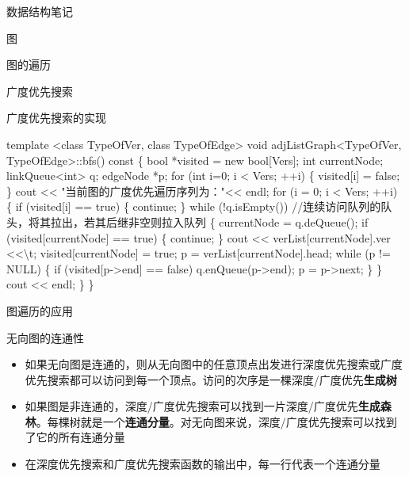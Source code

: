 \documentclass[
  ignorenonframetext,
]{beamer}
\newenvironment{Shaded}{}{}
\newcommand{\NormalTok}[1]{#1}
\providecommand{\tightlist}{%
  \setlength{\itemsep}{0pt}\setlength{\parskip}{0pt}}
\begin{document}
\begin{frame}[fragile]{数据结构笔记}
\begin{block}{图}
\begin{block}{图的遍历}
\begin{block}{广度优先搜索}
\begin{block}{广度优先搜索的实现}
\begin{Shaded}
\begin{Highlighting}[]
\NormalTok{template \textless{}class TypeOfVer, class TypeOfEdge\textgreater{}}
\NormalTok{void adjListGraph\textless{}TypeOfVer, TypeOfEdge\textgreater{}::bfs() const}
\NormalTok{\{}
\NormalTok{  bool *visited = new bool[Vers];}
\NormalTok{  int currentNode;}
\NormalTok{  linkQueue\textless{}int\textgreater{} q;}
\NormalTok{  edgeNode *p; }
\NormalTok{  for (int i=0; i \textless{} Vers; ++i)}
\NormalTok{  \{}
\NormalTok{   visited[i] = false;}
\NormalTok{  \}}
\NormalTok{  cout \textless{}\textless{} "当前图的广度优先遍历序列为："\textless{}\textless{} endl;}
\NormalTok{  for (i = 0; i \textless{} Vers; ++i)}
\NormalTok{  \{}
\NormalTok{    if (visited[i] == true)}
\NormalTok{    \{}
\NormalTok{      continue;}
\NormalTok{    \}}
\NormalTok{    while (!q.isEmpty()) //连续访问队列的队头，将其拉出，若其后继非空则拉入队列}
\NormalTok{    \{}
\NormalTok{      currentNode = q.deQueue();}
\NormalTok{      if (visited[currentNode] == true)}
\NormalTok{      \{}
\NormalTok{        continue;}
\NormalTok{      \}}
\NormalTok{      cout \textless{}\textless{} verList[currentNode].ver \textless{}\textless{}\textquotesingle{}\textbackslash{}t\textquotesingle{};}
\NormalTok{      visited[currentNode] = true;}
\NormalTok{      p = verList[currentNode].head;}
\NormalTok{      while (p != NULL)}
\NormalTok{      \{}
\NormalTok{        if (visited[p{-}\textgreater{}end] == false)}
\NormalTok{        q.enQueue(p{-}\textgreater{}end);}
\NormalTok{        p = p{-}\textgreater{}next;}
\NormalTok{      \}}
\NormalTok{    \}}
\NormalTok{    cout \textless{}\textless{} endl;}
\NormalTok{  \}}
\NormalTok{\} }
\end{Highlighting}
\end{Shaded}
\end{block}
\end{block}
\end{block}

\begin{block}{图遍历的应用}
\protect{}\label{ux56feux904dux5386ux7684ux5e94ux7528}
\begin{block}{无向图的连通性}
\protect{}\label{ux65e0ux5411ux56feux7684ux8fdeux901aux6027-1}
\begin{itemize}
\tightlist
\item
  如果无向图是连通的，则从无向图中的任意顶点出发进行深度优先搜索或广度优先搜索都可以访问到每一个顶点。访问的次序是一棵深度/广度优先\textbf{生成树}
\item
  如果图是非连通的，深度/广度优先搜索可以找到一片深度/广度优先\textbf{生成森林}。每棵树就是一个\textbf{连通分量}。对无向图来说，深度/广度优先搜索可以找到了它的所有连通分量
\item
  在深度优先搜索和广度优先搜索函数的输出中，每一行代表一个连通分量
\end{itemize}
\end{block}


\end{block}
\end{block}
\end{frame}
\end{document}
